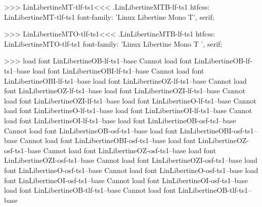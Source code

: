 {{{{{{{>>>
\<LinLibertineMT-tlf-ts1\><<<
.LinLibertineMTB-lf-ts1
htfcss:  LinLibertineMT-tlf-ts1  font-family: 'Linux Libertine Mono T', serif;

>>>
\<LinLibertineMTO-tlf-ts1\><<<
.LinLibertineMTB-lf-ts1
htfcss:  LinLibertineMTO-tlf-ts1  font-family: 'Linux Libertine Mono T ', serif;

>>>
load font	LinLibertineOB-lf-ts1--base
Cannot load font LinLibertineOB-lf-ts1--base
load font	LinLibertineOBI-lf-ts1--base
Cannot load font LinLibertineOBI-lf-ts1--base
load font	LinLibertineOZ-lf-ts1--base
Cannot load font LinLibertineOZ-lf-ts1--base
load font	LinLibertineOZI-lf-ts1--base
Cannot load font LinLibertineOZI-lf-ts1--base
load font	LinLibertineO-lf-ts1--base
Cannot load font LinLibertineO-lf-ts1--base
load font	LinLibertineOI-lf-ts1--base
Cannot load font LinLibertineOI-lf-ts1--base
load font	LinLibertineOB-osf-ts1--base
Cannot load font LinLibertineOB-osf-ts1--base
load font	LinLibertineOBI-osf-ts1--base
Cannot load font LinLibertineOBI-osf-ts1--base
load font	LinLibertineOZ-osf-ts1--base
Cannot load font LinLibertineOZ-osf-ts1--base
load font	LinLibertineOZI-osf-ts1--base
Cannot load font LinLibertineOZI-osf-ts1--base
load font	LinLibertineO-osf-ts1--base
Cannot load font LinLibertineO-osf-ts1--base
load font	LinLibertineOI-osf-ts1--base
Cannot load font LinLibertineOI-osf-ts1--base
load font	LinLibertineOB-tlf-ts1--base
Cannot load font LinLibertineOB-tlf-ts1--base
}}}}}}}
